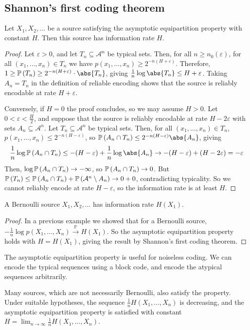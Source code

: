 \subsection{Shannon's first coding theorem}
\begin{theorem}
    Let $X_1, X_2, \dots$ be a source satisfying the asymptotic equipartition property with constant $H$.
    Then this source has information rate $H$.
\end{theorem}
\begin{proof}
    Let $\varepsilon > 0$, and let $T_n \subseteq \mathcal A^n$ be typical sets.
    Then, for all $n \geq n_0(\varepsilon)$, for all $(x_1, \dots, x_n) \in T_n$ we have $p(x_1, \dots, x_n) \geq 2^{-n(H + \varepsilon)}$.
    Therefore, $1 \geq \prob{T_n} \geq 2^{-n(H + \varepsilon)} \cdot \abs{T_n}$, giving $\frac{1}{n} \log \abs{T_n} \leq H + \varepsilon$.
    Taking $A_n = T_n$ in the definition of reliable encoding shows that the source is reliably encodable at rate $H + \varepsilon$.

    Conversely, if $H = 0$ the proof concludes, so we may assume $H > 0$.
    Let $0 < \varepsilon < \frac{H}{2}$, and suppose that the source is reliably encodable at rate $H - 2\varepsilon$ with sets $A_n \subseteq \mathcal A^n$.
    Let $T_n \subseteq \mathcal A^n$ be typical sets.
    Then, for all $(x_1, \dots, x_n) \in T_n$, $p(x_1, \dots, x_n) \leq 2^{-n(H - \varepsilon)}$, so $\prob{A_n \cap T_n} \leq 2^{-n(H - \varepsilon)} \abs{A_n}$, giving
    \[ \frac{1}{n} \log \prob{A_n \cap T_n} \leq -(H - \varepsilon) + \frac{1}{n} \log \abs{A_n} \to -(H - \varepsilon) + (H - 2 \varepsilon) = -\varepsilon \]
    Then, $\log \mathbb{P}\left({A_n \cap T_n}\right) \to -\infty$, so $\mathbb{P}\left({A_n \cap T_n}\right) \to 0$.
    But $\mathbb{P}\left({T_n}\right) \leq \mathbb{P}\left({A_n \cap T_n}\right) + \mathbb{P}\left({\mathcal A^n \setminus A_n}\right) \to 0 + 0$, contradicting typicality.
    So we cannot reliably encode at rate $H - \varepsilon$, so the information rate is at least $H$.
\end{proof}
\begin{corollary}
    A Bernoulli source $X_1, X_2, \dots$ has information rate $H(X_1)$.
\end{corollary}
\begin{proof}
    In a previous example we showed that for a Bernoulli source, $-\frac{1}{n} \log p(X_1, \dots, X_n) \xrightarrow{\mathbb P} H(X_1)$.
    So the asymptotic equipartition property holds with $H = H(X_1)$, giving the result by Shannon's first coding theorem.
\end{proof}
\begin{remark}
    The asymptotic equipartition property is useful for noiseless coding.
    We can encode the typical sequences using a block code, and encode the atypical sequences arbitrarily.

    Many sources, which are not necessarily Bernoulli, also satisfy the property.
    Under suitable hypotheses, the sequence $\frac{1}{n} H(X_1, \dots, X_n)$ is decreasing, and the asymptotic equipartition property is satisfied with constant $H = \lim_{n \to \infty} \frac{1}{n} H(X_1, \dots, X_n)$.
\end{remark}

